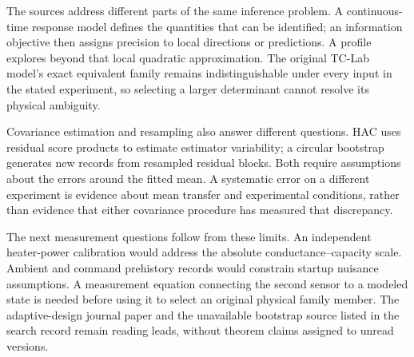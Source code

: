 The sources address different parts of the same inference problem. A
continuous-time response model defines the quantities that can be identified;
an information objective then assigns precision to local directions or
predictions. A profile explores beyond that local quadratic approximation.
The original TC-Lab model's exact equivalent family remains indistinguishable
under every input in the stated experiment, so selecting a larger determinant
cannot resolve its physical ambiguity.

Covariance estimation and resampling also answer different questions. HAC
uses residual score products to estimate estimator variability; a circular
bootstrap generates new records from resampled residual blocks. Both require
assumptions about the errors around the fitted mean. A systematic error on a
different experiment is evidence about mean transfer and experimental
conditions, rather than evidence that either covariance procedure has measured
that discrepancy.

The next measurement questions follow from these limits. An independent
heater-power calibration would address the absolute conductance--capacity
scale. Ambient and command prehistory records would constrain startup nuisance
assumptions. A measurement equation connecting the second sensor to a modeled
state is needed before using it to select an original physical family member.
The adaptive-design journal paper and the
unavailable bootstrap source listed in the search record remain reading leads,
without theorem claims assigned to unread versions.
